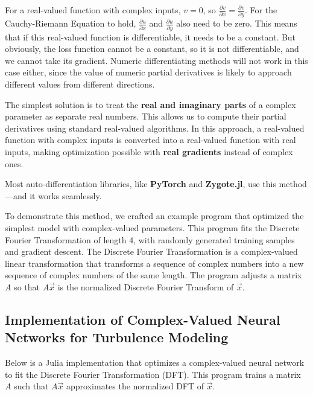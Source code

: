 \documentclass[a4paper,10.5pt]{article}
\begin{document}
For a real-valued function with complex inputs, $v = 0$, so $\frac{\partial v}{\partial x} = \frac{\partial v}{\partial y}$. For the Cauchy-Riemann Equation to hold, $\frac{\partial u}{\partial x}$ and $\frac{\partial u}{\partial y}$ also need to be zero. This means that if this real-valued function is differentiable, it needs to be a constant. But obviously, the loss function cannot be a constant, so it is not differentiable, and we cannot take its gradient. Numeric differentiating methods will not work in this case either, since the value of numeric partial derivatives is likely to approach different values from different directions.

\vspace{0.5cm}

The simplest solution is to treat the \textbf{real and imaginary parts} of a complex parameter as separate real numbers. This allows us to compute their partial derivatives using standard real-valued algorithms. In this approach, a real-valued function with complex inputs is converted into a real-valued function with real inputs, making optimization possible with \textbf{real gradients} instead of complex ones.

\vspace{0.5cm}

Most auto-differentiation libraries, like \textbf{PyTorch} and \textbf{Zygote.jl}, use this method—and it works seamlessly.

\vspace{0.5cm}

To demonstrate this method, we crafted an example program that optimized the simplest model with complex-valued parameters. This program fits the Discrete Fourier Transformation of length 4, with randomly generated training samples and gradient descent. The Discrete Fourier Transformation is a complex-valued linear transformation that transforms a sequence of complex numbers into a new sequence of complex numbers of the same length. The program adjusts a matrix $A$ so that $A \vec{x}$ is the normalized Discrete Fourier Transform of $\vec{x}$.

\subsection{Implementation of Complex-Valued Neural Networks for Turbulence Modeling}

Below is a Julia implementation that optimizes a complex-valued neural network to fit the Discrete Fourier Transformation (DFT). This program trains a matrix $A$ such that $A \vec{x}$ approximates the normalized DFT of $\vec{x}$.
\end{document}
